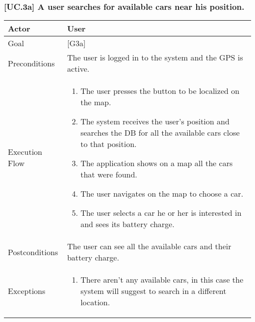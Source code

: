 \documentclass[english]{article}
\begin{document}
	\subsubsection{[UC.3a] A user searches for available cars near his position.}
	\begin{tabularx}{\textwidth}{  l  X  }
		\hline
		Actor & User\\
		\hline
		Goal & [G3a]\\
		\hline
		Preconditions & The user is logged in to the system and the GPS is active.\\
		\hline
		Execution Flow & \begin{enumerate}
			\item{The user presses the button to be localized on the map.}
			\item{The system receives the user's position and searches the DB for all the available cars close to that position.}
			\item{The application shows on a map all the cars that were found.}
			\item{The user navigates on the map to choose a car.}
			\item{The user selects a car he or her is interested in and sees its battery charge.}
		\end{enumerate}\\
		\hline
		Postconditions & The user can see all the available cars and their battery charge.\\
		\hline
		Exceptions & \begin{enumerate}
			\item{There aren't any available cars, in this case the system will suggest to search in a different location.}
		\end{enumerate}\\
		\hline
	\end{tabularx}
	
\end{document}
